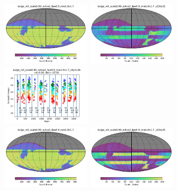 \documentclass[modern]{aastex62}
\begin{document}
\begin{figure}
\includegraphics[height=1.25in, width=1.75in]{plots/bulge_roll_scale0.90_nslice2_fpw0.9_nrw1.0v1.7/bulge_roll_scale0_90_nslice2_fpw0_9_nrw1_0v1_7_Count_HEAL_SkyMap.pdf}
\includegraphics[height=1.25in, width=1.75in]{plots/bulge_roll_scale0.90_nslice2_fpw0.9_nrw1.0v1.7/bulge_roll_scale0_90_nslice2_fpw0_9_nrw1_0v1_7_Count_night_gt_913_125000_and_night_lt_1278_375000_and_note_not_like_DD_HEAL_SkyMap.pdf}
\includegraphics[height=1.25in, width=1.75in]{plots/bulge_roll_scale090_nslice2_fpw09_nrw10v17_spotc.pdf} \\
\includegraphics[height=1.25in, width=1.75in]{plots/bulge_roll_scale0.90_nslice3_fpw0.9_nrw1.0v1.7/bulge_roll_scale0_90_nslice3_fpw0_9_nrw1_0v1_7_Count_HEAL_SkyMap.pdf}
\includegraphics[height=1.25in, width=1.75in]{plots/bulge_roll_scale0.90_nslice3_fpw0.9_nrw1.0v1.7/bulge_roll_scale0_90_nslice3_fpw0_9_nrw1_0v1_7_Count_night_gt_913_125000_and_night_lt_1278_375000_and_note_not_like_DD_HEAL_SkyMap.pdf}

\end{figure}
\end{document}
